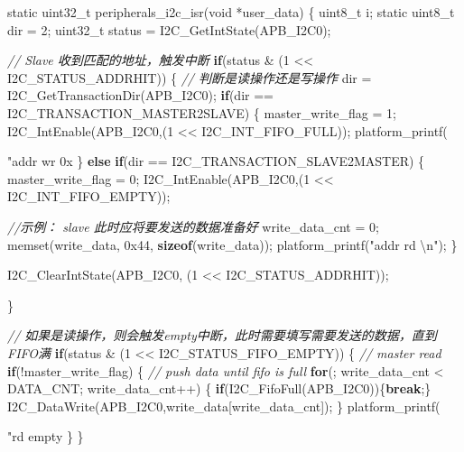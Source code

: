 \documentclass[
  12pt,
]{book}
\newenvironment{Shaded}{\begin{snugshade}}{\end{snugshade}}
\newcommand{\BaseNTok}[1]{\textcolor[rgb]{0.00,0.00,0.81}{#1}}
\newcommand{\CommentTok}[1]{\textcolor[rgb]{0.56,0.35,0.01}{\textit{#1}}}
\newcommand{\ControlFlowTok}[1]{\textcolor[rgb]{0.13,0.29,0.53}{\textbf{#1}}}
\newcommand{\DataTypeTok}[1]{\textcolor[rgb]{0.13,0.29,0.53}{#1}}
\newcommand{\DecValTok}[1]{\textcolor[rgb]{0.00,0.00,0.81}{#1}}
\newcommand{\KeywordTok}[1]{\textcolor[rgb]{0.13,0.29,0.53}{\textbf{#1}}}
\newcommand{\NormalTok}[1]{#1}
\newcommand{\SpecialCharTok}[1]{\textcolor[rgb]{0.00,0.00,0.00}{#1}}
\newcommand{\StringTok}[1]{\textcolor[rgb]{0.31,0.60,0.02}{#1}}
\begin{document}
\begin{Shaded}
\begin{Highlighting}[]
\DataTypeTok{static} \DataTypeTok{uint32_t}\NormalTok{ peripherals_i2c_isr(}\DataTypeTok{void}\NormalTok{ *user_data)}
\NormalTok{\{}
  \DataTypeTok{uint8_t}\NormalTok{ i;}
  \DataTypeTok{static} \DataTypeTok{uint8_t}\NormalTok{ dir = }\DecValTok{2}\NormalTok{;}
  \DataTypeTok{uint32_t}\NormalTok{ status = I2C_GetIntState(APB_I2C0);}

  \CommentTok{// Slave 收到匹配的地址，触发中断}
  \ControlFlowTok{if}\NormalTok{(status & (}\DecValTok{1}\NormalTok{ << I2C_STATUS_ADDRHIT))}
\NormalTok{  \{}
    \CommentTok{// 判断是读操作还是写操作}
\NormalTok{    dir = I2C_GetTransactionDir(APB_I2C0);}
    \ControlFlowTok{if}\NormalTok{(dir == I2C_TRANSACTION_MASTER2SLAVE)}
\NormalTok{    \{}
\NormalTok{        master_write_flag = }\DecValTok{1}\NormalTok{;}
\NormalTok{        I2C_IntEnable(APB_I2C0,(}\DecValTok{1}\NormalTok{ << I2C_INT_FIFO_FULL));}
\NormalTok{        platform_printf(}\StringTok{"addr wr 0x%
\NormalTok{    \}}
    \ControlFlowTok{else} \ControlFlowTok{if}\NormalTok{(dir == I2C_TRANSACTION_SLAVE2MASTER)}
\NormalTok{    \{}
\NormalTok{        master_write_flag = }\DecValTok{0}\NormalTok{;}
\NormalTok{        I2C_IntEnable(APB_I2C0,(}\DecValTok{1}\NormalTok{ << I2C_INT_FIFO_EMPTY));}
        
        \CommentTok{//示例： slave 此时应将要发送的数据准备好}
\NormalTok{        write_data_cnt = }\DecValTok{0}\NormalTok{;}
\NormalTok{        memset(write_data, }\BaseNTok{0x44}\NormalTok{, }\KeywordTok{sizeof}\NormalTok{(write_data));}
\NormalTok{        platform_printf(}\StringTok{"addr rd }\SpecialCharTok{\textbackslash{}n}\StringTok{"}\NormalTok{);}
\NormalTok{    \}}

\NormalTok{    I2C_ClearIntState(APB_I2C0, (}\DecValTok{1}\NormalTok{ << I2C_STATUS_ADDRHIT));}

\NormalTok{  \}}
  
  \CommentTok{// 如果是读操作，则会触发empty中断，此时需要填写需要发送的数据，直到FIFO满}
  \ControlFlowTok{if}\NormalTok{(status & (}\DecValTok{1}\NormalTok{ << I2C_STATUS_FIFO_EMPTY))}
\NormalTok{  \{}
    \CommentTok{// master read}
    \ControlFlowTok{if}\NormalTok{(!master_write_flag)}
\NormalTok{    \{}
      \CommentTok{// push data until fifo is full}
      \ControlFlowTok{for}\NormalTok{(; write_data_cnt < DATA_CNT; write_data_cnt++)}
\NormalTok{      \{}
        \ControlFlowTok{if}\NormalTok{(I2C_FifoFull(APB_I2C0))\{}\ControlFlowTok{break}\NormalTok{;\}}
\NormalTok{        I2C_DataWrite(APB_I2C0,write_data[write_data_cnt]);}
\NormalTok{      \}}
\NormalTok{      platform_printf(}\StringTok{"rd empty %
\NormalTok{    \}}
\NormalTok{  \}}
  
}}
\end{Highlighting}
\end{Shaded}
\end{document}
